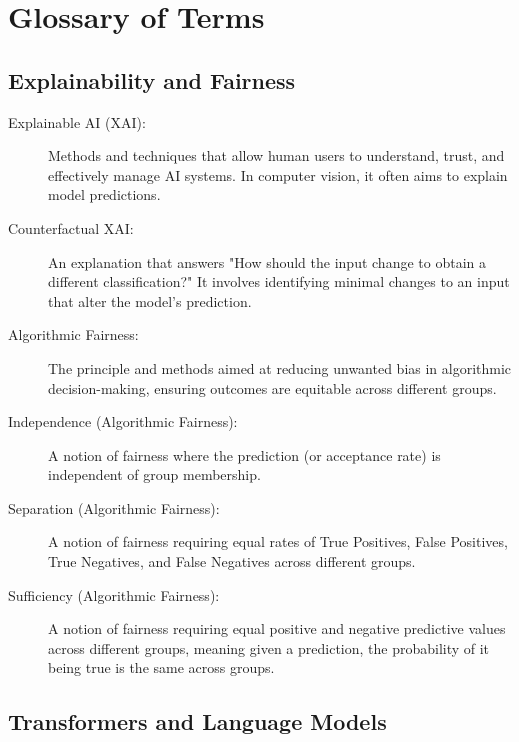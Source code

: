 \chapter{Glossary of Terms}

\section{Explainability and Fairness}

\begin{description}
  \item[Explainable AI (XAI):] Methods and techniques that allow human users to understand, trust, and effectively manage AI systems. In computer vision, it often aims to explain model predictions.
  \item[Counterfactual XAI:] An explanation that answers "How should the input change to obtain a different classification?" It involves identifying minimal changes to an input that alter the model's prediction.
  \item[Algorithmic Fairness:] The principle and methods aimed at reducing unwanted bias in algorithmic decision-making, ensuring outcomes are equitable across different groups.
  \item[Independence (Algorithmic Fairness):] A notion of fairness where the prediction (or acceptance rate) is independent of group membership.
  \item[Separation (Algorithmic Fairness):] A notion of fairness requiring equal rates of True Positives, False Positives, True Negatives, and False Negatives across different groups.
  \item[Sufficiency (Algorithmic Fairness):] A notion of fairness requiring equal positive and negative predictive values across different groups, meaning given a prediction, the probability of it being true is the same across groups.
\end{description}

\section{Transformers and Language Models}

